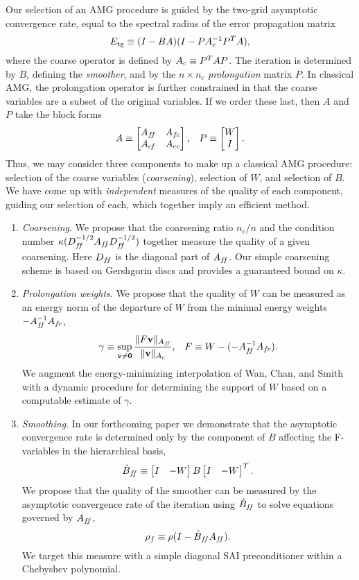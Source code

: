 \documentclass{report}
\begin{document}
Our selection of an AMG procedure is guided by the two-grid asymptotic
convergence rate, equal to the spectral radius of the error propagation
matrix \[ E_{\text{tg}} \equiv (I - B A)(I - P A_c^{-1} P^T A), \] where the coarse
operator is defined by $A_c \equiv P^T A P$. The iteration is determined by
$B$, defining the \emph{smoother}, and by the $n \times n_c$
\emph{prolongation} matrix $P$. In classical AMG, the prolongation operator is
further constrained in that the coarse variables are a subset of the
original variables. If we order these last, then $A$ and $P$ take the block
forms \begin{eqnarray*}
A \equiv \begin{bmatrix} A_{f\hspace{-0.1667 em}f} & A_{f\hspace{-0.0833 em}c} \\ A_{c\hspace{-0.0833 em}f} & A_{c\hspace{0 em}c} \end{bmatrix}, &&
P \equiv \begin{bmatrix} W \\ I \end{bmatrix}. \end{eqnarray*}
Thus, we may consider three components to make up a classical AMG procedure:
selection of the coarse variables (\emph{coarsening}), selection of $W$, and
selection of $B$. We have come up with \emph{independent} measures of the
quality of each component, guiding our selection of each, which together imply
an efficient method.
\begin{enumerate}
\item \emph{Coarsening}. We propose that the coarsening ratio $n_c/n$ and
the condition number $\kappa(D_{f\hspace{-0.1667 em}f}^{-1/2} A_{f\hspace{-0.1667 em}f} D_{f\hspace{-0.1667 em}f}^{-1/2})$ together measure
the quality of a given coarsening. Here $D_{f\hspace{-0.1667 em}f}$ is the diagonal part of
$A_{f\hspace{-0.1667 em}f}$. Our simple coarsening scheme is based on Gershgorin discs and provides
a guaranteed bound on $\kappa$.
\item \emph{Prolongation weights}. We propose that the quality of $W$ can be
measured as an energy norm of the departure of $W$ from the minimal energy
weights $-A_{f\hspace{-0.1667 em}f}^{-1} A_{f\hspace{-0.0833 em}c}$,
\begin{eqnarray*}
\gamma \equiv \sup_{\mathbf{v} \ne \mathbf{0}} \frac{\lVert F\mathbf{v} \rVert_{A_{f\hspace{-0.1667 em}f}}}{\lVert \mathbf{v} \rVert_{A_c}},
&&
F \equiv W - (-A_{f\hspace{-0.1667 em}f}^{-1} A_{f\hspace{-0.0833 em}c}).
\end{eqnarray*}
We augment the energy-minimizing interpolation of Wan, Chan, and Smith
with a dynamic procedure for determining the support of $W$ based
on a computable estimate of $\gamma$.
\item \emph{Smoothing}. In our forthcoming paper we demonstrate that the
asymptotic convergence rate is determined only by the component of $B$
affecting the F-variables in the hierarchical basis,
\[ \hat{B}_{f\hspace{-0.1667 em}f} \equiv \begin{bmatrix} I & -W \end{bmatrix} B
\begin{bmatrix} I & -W \end{bmatrix}^T. \]
We propose that the quality of the smoother can be measured by the asymptotic
convergence rate of the iteration using $\hat{B}_{f\hspace{-0.1667 em}f}$ to solve equations
governed by $A_{f\hspace{-0.1667 em}f}$,
\[ \rho_f \equiv \rho ( I - \hat{B}_{f\hspace{-0.1667 em}f} A_{f\hspace{-0.1667 em}f} ). \]
We target this measure with a simple diagonal SAI
preconditioner within a Chebyshev polynomial.
\end{enumerate}
\end{document}
